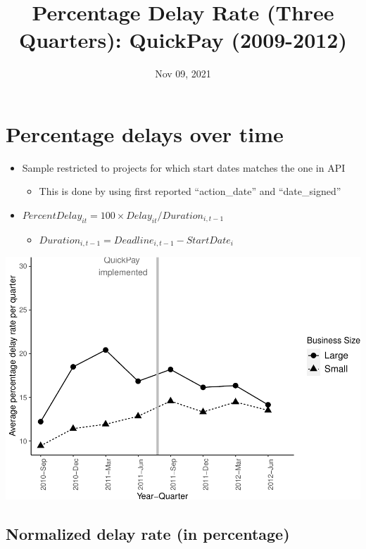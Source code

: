 \documentclass[
]{article}
\title{Percentage Delay Rate (Three Quarters): QuickPay (2009-2012)}
\author{}
\date{\vspace{-2.5em}Nov 09, 2021}
\providecommand{\tightlist}{%
  \setlength{\itemsep}{0pt}\setlength{\parskip}{0pt}}
\begin{document}
\maketitle

\hypertarget{percentage-delays-over-time}{%
\section{Percentage delays over
time}\label{percentage-delays-over-time}}

\begin{itemize}
\tightlist
\item
  Sample restricted to projects for which start dates matches the one in
  API

  \begin{itemize}
  \tightlist
  \item
    This is done by using first reported ``action\_date'' and
    ``date\_signed''
  \end{itemize}
\item
  \(PercentDelay_{it}=100 \times Delay_{it}/Duration_{i,t-1}\)

  \begin{itemize}
  \tightlist
  \item
    \(Duration_{i,t-1} = Deadline_{i,t-1} - StartDate_i\)
  \end{itemize}
\end{itemize}

\includegraphics{qp_first_pc_delay_three_quarters_files/figure-latex/plot_pc_delay-1.pdf}

\hypertarget{normalized-delay-rate-in-percentage}{%
\subsection{Normalized delay rate (in
percentage)}\label{normalized-delay-rate-in-percentage}}
\end{document}
